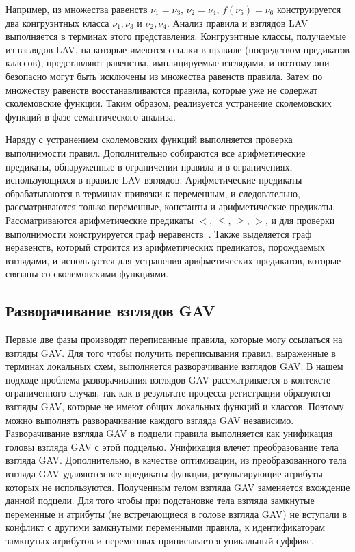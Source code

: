 \begin{multicols}{2}
     Например, из множества равенств $\nu_1=\nu_3$, $\nu_2=\nu_4$, $f(\nu_5)=\nu_6$
конструируется два конгруэнтных класса {$\nu_1,\nu_3$} и {$\nu_2,\nu_4$}. Анализ
правила и взглядов LAV выполняется в терминах этого представления. Конгруэнтные
классы, получаемые из взглядов LAV, на которые имеются ссылки в правиле
(посредством предикатов классов), представляют равенства, имплицируемые взглядами, и
поэтому они безопасно могут быть исключены из множества равенств правила. Затем по
множеству равенств восстанавливаются правила, которые уже не содержат сколемовские
функции. Таким образом, реализуется устранение сколемовских функций в фазе
семантического анализа.

     Наряду с устранением сколемовских функций выполняется проверка выполнимости
правил. Дополнительно собираются все арифметические предикаты, обнаруженные в
ограничении правила и в ограничениях, использующихся в правиле LAV взглядов.
Арифметические предикаты обрабатываются в терминах привязки к переменным, и
следовательно, рассматриваются только переменные, константы и арифметические
предикаты. Рас\-смат\-ри\-ва\-ют\-ся арифметические предикаты $<$, $\leq$, $\geq$, $>$, и для
проверки выполнимости конструируется граф неравенств~\cite{Afr06}. Также выделяется
граф неравенств, который строится из арифметических предикатов, порождаемых
взглядами, и используется для устранения арифметических предикатов, которые связаны
со сколемовскими функциями.

\subsection{Разворачивание взглядов GAV }

     Первые две фазы производят переписанные правила, которые могу ссылаться на
взгляды GAV. Для того чтобы получить переписывания правил, выраженные в терминах
локальных схем, выполняется разворачивание взглядов GAV. В нашем подходе проблема
разворачивания взглядов GAV рассматривается в контексте ограниченного случая, так как
в результате процесса регистрации образуются взгляды GAV, которые не имеют общих
локальных функций и классов. Поэтому можно выполнять разворачивание каждого
взгляда GAV независимо. Разворачивание взгляда GAV в подцели правила выполняется
как унификация головы взгляда GAV с этой подцелью. Унификация влечет
преобразование тела взгляда GAV. Дополнительно, в качестве оптимизации, из
преобразованного тела взгляда GAV удаляются все предикаты функции, результирующие
атрибуты которых не используются. Полученным телом взгляда GAV заменяется
вхождение данной подцели. Для того чтобы при подстановке тела взгляда замкнутые
переменные и атрибуты (не встречающиеся в голове взгляда GAV) не вступали в
конфликт с другими замкнутыми переменными правила, к идентификаторам замкнутых
атрибутов и переменных приписывается уникальный суффикс.


\end{multicols}
